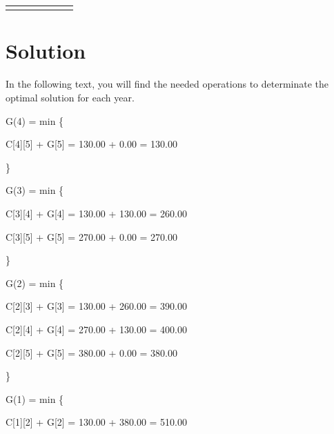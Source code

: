 \documentclass{article}
\begin{document}
\begin{center}
\begin{adjustbox}{max width=\textwidth}
\begin{tabular}{|c||c|c|c|c|c|c|}
        \hline
        \cellcolor{DonCangrejo}{\textbf{\textcolor{white}{i=4}}}& \cellcolor{CangrejoInside}{$-$} & \cellcolor{CangrejoInside}{$-$} & \cellcolor{CangrejoInside}{$-$} & \cellcolor{CangrejoInside}{$-$} & \cellcolor{CangrejoInside}{$-$} & \cellcolor{CangrejoInside}{$130.00$ \$}\\
        \hline
        \cellcolor{DonCangrejo}{\textbf{\textcolor{white}{i=5}}}& \cellcolor{CangrejoInside}{$-$} & \cellcolor{CangrejoInside}{$-$} & \cellcolor{CangrejoInside}{$-$} & \cellcolor{CangrejoInside}{$-$} & \cellcolor{CangrejoInside}{$-$} & \cellcolor{CangrejoInside}{$-$} \\
        \hline
    \end{tabular}
\end{adjustbox}


\end{center}



\section{Solution}
In the following text, you will find the needed operations to determinate the optimal solution for each year.

G(4) = min \{ 

\hspace{1cm} C[4][5] + G[5] = 130.00 + 0.00 = 130.00 

 \} 


G(3) = min \{ 

\hspace{1cm} C[3][4] + G[4] = 130.00 + 130.00 = 260.00 

\hspace{1cm} C[3][5] + G[5] = 270.00 + 0.00 = 270.00 

 \} 


G(2) = min \{ 

\hspace{1cm} C[2][3] + G[3] = 130.00 + 260.00 = 390.00 

\hspace{1cm} C[2][4] + G[4] = 270.00 + 130.00 = 400.00 

\hspace{1cm} C[2][5] + G[5] = 380.00 + 0.00 = 380.00 

 \} 


G(1) = min \{ 

\hspace{1cm} C[1][2] + G[2] = 130.00 + 380.00 = 510.00 
\end{document}
